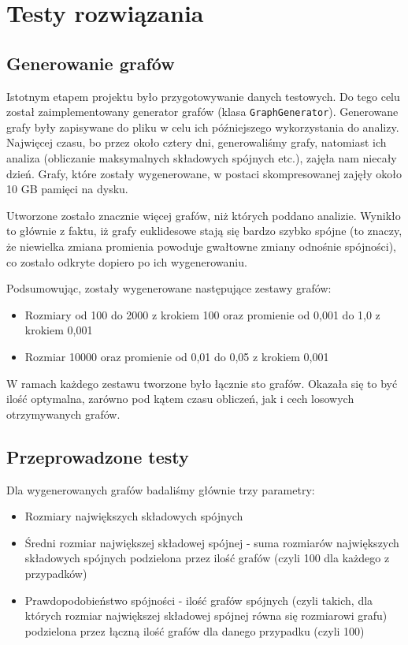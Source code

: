 \section{Testy rozwiązania}
	\label{final:testy}

	\subsection{Generowanie grafów}
		\label{final:testy:generowanie}

		Istotnym etapem projektu było przygotowywanie danych testowych. Do tego celu został zaimplementowany generator grafów (klasa \texttt{GraphGenerator}). Generowane grafy były zapisywane do pliku w celu ich późniejszego wykorzystania do analizy. Najwięcej czasu, bo przez około cztery dni, generowaliśmy grafy, natomiast ich analiza (obliczanie maksymalnych składowych spójnych etc.), zajęła nam niecały dzień. Grafy, które zostały wygenerowane, w postaci skompresowanej zajęły około 10 GB pamięci na dysku.

		Utworzone zostało znacznie więcej grafów, niż których poddano analizie. Wynikło to głównie z faktu, iż grafy euklidesowe stają się bardzo szybko spójne (to znaczy, że niewielka zmiana promienia powoduje gwałtowne zmiany odnośnie spójności), co zostało odkryte dopiero po ich wygenerowaniu.

		Podsumowując, zostały wygenerowane następujące zestawy grafów:
		\begin{itemize}
			\item Rozmiary od 100 do 2000 z krokiem 100 oraz promienie od 0,001 do 1,0 z krokiem 0,001
			\item Rozmiar 10000 oraz promienie od 0,01 do 0,05 z krokiem 0,001
		\end{itemize}

		W ramach każdego zestawu tworzone było łącznie sto grafów. Okazała się to być ilość optymalna, zarówno pod kątem czasu obliczeń, jak i cech losowych otrzymywanych grafów.

	\subsection{Przeprowadzone testy}
		\label{final:testy:przyklad1}

		Dla wygenerowanych grafów badaliśmy głównie trzy parametry:
		\begin{itemize}
			\item Rozmiary największych składowych spójnych
			\item Średni rozmiar największej składowej spójnej - suma rozmiarów największych składowych spójnych podzielona przez ilość grafów (czyli 100 dla każdego z przypadków)
			\item Prawdopodobieństwo spójności - ilość grafów spójnych (czyli takich, dla których rozmiar największej składowej spójnej równa się rozmiarowi grafu) podzielona przez łączną ilość grafów dla danego przypadku (czyli 100)
		\end{itemize}

